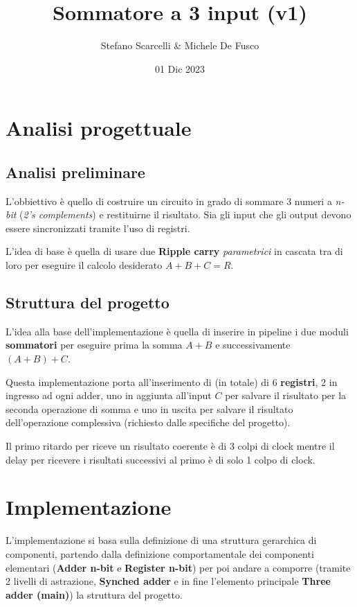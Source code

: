 \documentclass[12pt]{article}
\title{Sommatore a 3 input (v1)}
\author{Stefano Scarcelli \& Michele De Fusco}
\date{01 Dic 2023}
\begin{document}
\maketitle
\newpage

\tableofcontents
\newpage


\section{Analisi progettuale}
    \subsection{Analisi preliminare}
        L'obbiettivo è quello di costruire un circuito in grado di sommare 3 numeri a \textit{n-bit} (\textit{2's complements}) e restituirne il risultato. Sia gli input che gli output devono essere sincronizzati tramite l'uso di registri.

        L'idea di base è quella di usare due \textbf{Ripple carry} \textit{parametrici} in cascata tra di loro per eseguire il calcolo desiderato $A+B+C=R$.
    
    \subsection{Struttura del progetto}
        L'idea alla base dell'implementazione è quella di inserire in pipeline i due moduli \textbf{sommatori} per eseguire prima la somma $A+B$ e successivamente $(A+B)+C$.

        Questa implementazione porta all'inserimento di (in totale) di 6 \textbf{registri}, 2 in ingresso ad ogni adder, uno in aggiunta all'input $C$ per salvare il risultato per la seconda operazione di somma e uno in uscita per salvare il risultato dell'operazione complessiva (richiesto dalle specifiche del progetto).

        Il primo ritardo per riceve un risultato coerente è di 3 colpi di clock mentre il delay per ricevere i risultati successivi al primo è di solo 1 colpo di clock.

\section{Implementazione}
    L'implementazione si basa sulla definizione di una struttura gerarchica di componenti, partendo dalla definizione comportamentale dei componenti elementari (\textbf{Adder n-bit} e \textbf{Register n-bit}) per poi andare a comporre (tramite 2 livelli di astrazione, \textbf{Synched adder} e in fine l'elemento principale \textbf{Three adder (main)}) la struttura del progetto.
\end{document}
